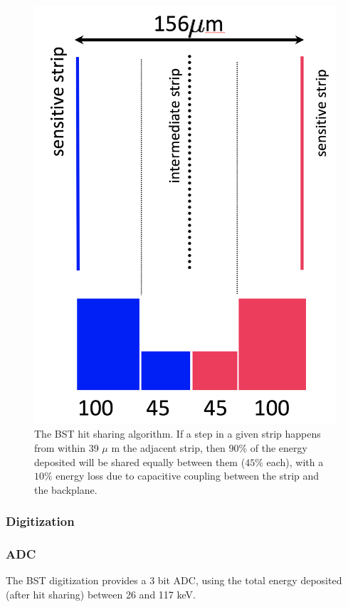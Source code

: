 \begin{figure}[t]
	\centering
	\includegraphics[width=0.95\columnwidth,keepaspectratio]{img/bstHitSharing.png}
	\caption{The BST hit sharing algorithm. If a step in a given strip happens from within 39 $\mu$ m the adjacent strip, then
            $90\%$ of the energy deposited will be shared equally between them ($45\%$ each), with a $10\%$ energy loss due
	         to capacitive coupling between the strip and the backplane.}
	\label{fig:bstHitSharing}
\end{figure}


\subsubsection{Digitization}

\subsubsection{ADC}
The BST digitization provides a 3 bit ADC, using the total energy deposited (after hit sharing) between 26 and 117 keV.

